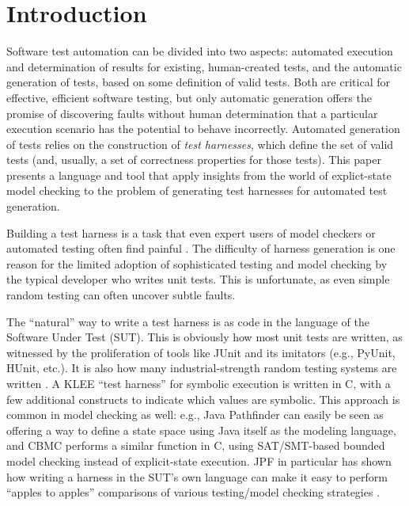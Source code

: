 \section{Introduction}

Software test automation can be divided into two aspects:  automated execution
and determination of results for existing, human-created tests, and
the automatic generation of tests, based on some definition of valid
tests.  Both are critical for effective, efficient software testing,
but only automatic generation offers the promise of discovering faults
without human determination that a particular execution scenario has
the potential to behave incorrectly.  Automated generation of tests
relies on the construction of \emph{test harnesses}, which define the
set of valid tests (and, usually, a set of correctness properties for
those tests).
This paper presents a language and tool that apply insights from the
world of explict-state model checking to the problem of generating
test harnesses for automated test generation.  

Building a test harness is a task that even expert users of model
checkers or automated testing often find painful
\cite{woda08,woda12}.  The difficulty of harness generation is one
reason for the limited adoption of sophisticated testing and model
checking by the typical developer who writes unit tests.  This is
unfortunate, as even simple random testing can often uncover subtle
faults.

The ``natural'' way to write a test harness is as code in the language
of the Software Under Test (SUT).  This is obviously how most unit
tests are written, as witnessed by the proliferation of tools like
JUnit \cite{JUnit} and its imitators (e.g., PyUnit, HUnit, etc.).  It
is also how many industrial-strength random testing systems are
written \cite{ICSEDiff,AMAI}.  A KLEE ``test harness'' \cite{KLEE} for
symbolic execution is written in C, with a few additional constructs
to indicate which values are symbolic.  This approach is common in
model checking as well: e.g., Java Pathfinder \cite{JPF,JPF2} can
easily be seen as offering a way to define a state space using Java
itself as the modeling language, and CBMC \cite{CBMC,CBMCp} performs a
similar function in C, using SAT/SMT-based bounded model checking
instead of explicit-state execution.  JPF in particular has shown how
writing a harness in the SUT's own language can make it easy to
perform ``apples to apples'' comparisons of various testing/model
checking strategies \cite{JPFRandTest}.



